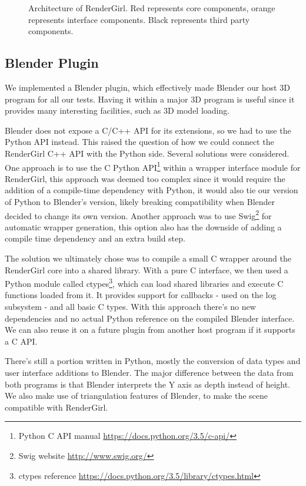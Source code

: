 \documentclass{vgtc}
\begin{document}
\begin{figure}
\centering

\caption{Architecture of RenderGirl. Red represents core components,
  orange represents interface components. Black represents third party
  components.}
\label{fig:architecture}
\end{figure}

\subsection{Blender Plugin}

We implemented a Blender plugin, which effectively made Blender our
host 3D program for all our tests. Having it within a major 3D program
is useful since it provides many interesting facilities, such as 3D
model loading.

Blender does not expose a C/C++ API for its extensions, so we had to
use the Python API instead. This raised the question of how we could
connect the RenderGirl C++ API with the Python side. Several solutions
were considered. One approach is to use the C Python
API\footnote{Python C API manual
  \url{https://docs.python.org/3.5/c-api/}} within a wrapper interface
module for RenderGirl, this approach was deemed too complex since it
would require the addition of a compile-time dependency with Python, it
would also tie our version of Python to Blender's version, likely
breaking compatibility when Blender decided to change its own
version. Another approach was to use Swig\footnote{Swig website
  \url{http://www.swig.org/}} for automatic wrapper generation, this
option also has the downside of adding a compile time dependency and an
extra build step.

The solution we ultimately chose was to compile a small C wrapper
around the RenderGirl core into a shared library. With a pure C
interface, we then used a Python module called ctypes\footnote{ctypes
  reference \url{https://docs.python.org/3.5/library/ctypes.html}},
which can load shared libraries and execute C functions loaded from
it. It provides support for callbacks - used on the log subsystem -
and all basic C types. With this approach there's no new dependencies
and no actual Python reference on the compiled Blender interface. We
can also reuse it on a future plugin from another host program if it
supports a C API.

There's still a portion written in Python, mostly the conversion of
data types and user interface additions to Blender. The major
difference between the data from both programs is that Blender
interprets the Y axis as depth instead of height. We also make use
of triangulation features of Blender, to make the scene compatible
with RenderGirl.
\end{document}
